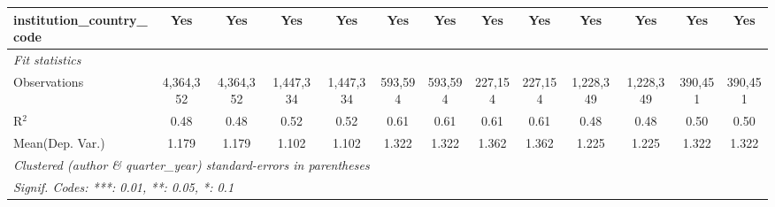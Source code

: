 \begin{tabular}{lcccccccccccc}
   institution\_country\_code               & Yes           & Yes           & Yes           & Yes           & Yes            & Yes            & Yes            & Yes            & Yes           & Yes           & Yes            & Yes\\  
   \midrule
   \emph{Fit statistics}\\
   Observations                             & 4,364,352     & 4,364,352     & 1,447,334     & 1,447,334     & 593,594        & 593,594        & 227,154        & 227,154        & 1,228,349     & 1,228,349     & 390,451        & 390,451\\  
   R$^2$                                    & 0.48          & 0.48          & 0.52          & 0.52          & 0.61           & 0.61           & 0.61           & 0.61           & 0.48          & 0.48          & 0.50           & 0.50\\  
Mean(Dep. Var.) & 1.179 & 1.179 & 1.102 & 1.102 & 1.322 & 1.322 & 1.362 & 1.362 & 1.225 & 1.225 & 1.322 & 1.322 \\
   \midrule \midrule
   \multicolumn{13}{l}{\emph{Clustered (author \& quarter\_year) standard-errors in parentheses}}\\
   \multicolumn{13}{l}{\emph{Signif. Codes: ***: 0.01, **: 0.05, *: 0.1}}\\
\end{tabular}
\par\endgroup
